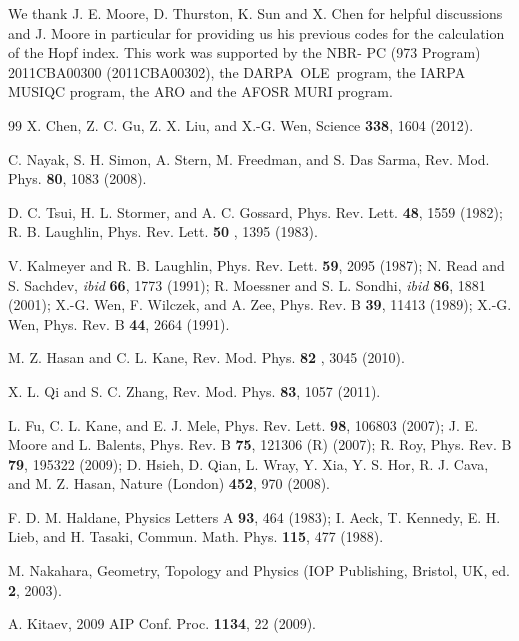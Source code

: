 \documentclass[twocolumn,prb,aps,epsfig,superscriptaddress,showpacs]{revtex4-1}
\begin{document}
\begin{acknowledgments}
We thank J. E. Moore, D. Thurston, K. Sun and X. Chen for helpful
discussions and J. Moore in particular for providing us his previous codes
for the calculation of the Hopf index. This work was supported by the NBR-
PC (973 Program) 2011CBA00300 (2011CBA00302), the DARPA\ OLE\ program, the
IARPA MUSIQC program, the ARO and the AFOSR MURI program.
\end{acknowledgments}

\begin{thebibliography}{99}
 X. Chen, Z. C. Gu, Z. X. Liu, and X.-G. Wen, Science
\textbf{338}, 1604 (2012).

 C. Nayak, S. H. Simon, A. Stern, M. Freedman, and S. Das
Sarma, Rev. Mod. Phys. \textbf{80}, 1083 (2008).

 D. C. Tsui, H. L. Stormer, and A. C. Gossard, Phys. Rev.
Lett. \textbf{48}, 1559 (1982); R. B. Laughlin, Phys. Rev. Lett. \textbf{50}%
, 1395 (1983).

 V. Kalmeyer and R. B. Laughlin, Phys. Rev. Lett.
\textbf{59}, 2095 (1987); N. Read and S. Sachdev, \emph{ibid} \textbf{66},
1773 (1991); R. Moessner and S. L. Sondhi, \emph{ibid} \textbf{86}, 1881
(2001); X.-G. Wen, F. Wilczek, and A. Zee, Phys. Rev. B \textbf{39}, 11413
(1989); X.-G. Wen, Phys. Rev. B \textbf{44}, 2664 (1991).

 M. Z. Hasan and C. L. Kane, Rev. Mod. Phys. \textbf{82}%
, 3045 (2010).

 X. L. Qi and S. C. Zhang, Rev. Mod. Phys. \textbf{83}, 1057
(2011).

 L. Fu, C. L. Kane, and E. J. Mele, Phys. Rev. Lett. \textbf{98},
106803 (2007); J. E. Moore and L. Balents, Phys. Rev. B \textbf{75}, 121306 (R)
(2007); R. Roy, Phys. Rev. B \textbf{79}, 195322 (2009); D. Hsieh, D. Qian, L. Wray, Y. Xia, Y. S. Hor, R. J. Cava, and M. Z. Hasan, Nature
(London) \textbf{452}, 970 (2008).

 F. D. M. Haldane, Physics Letters A \textbf{93}, 464 (1983);
I. Aeck, T. Kennedy, E. H. Lieb, and H. Tasaki, Commun. Math. Phys. \textbf{115}, 477 (1988).

 M. Nakahara, Geometry, Topology and Physics (IOP
Publishing, Bristol, UK, ed. \textbf{2}, 2003).

 A. Kitaev, 2009 AIP Conf. Proc. \textbf{1134}, 22
(2009).


\end{thebibliography}
\end{document}
